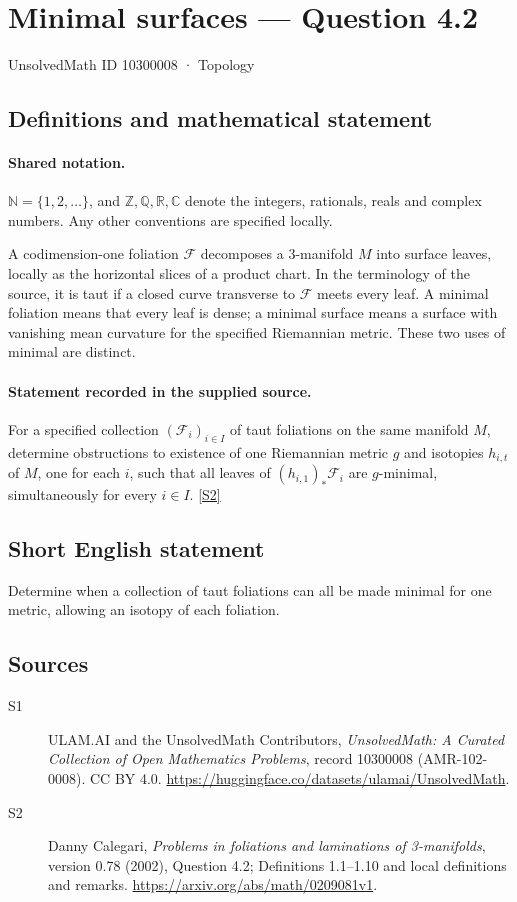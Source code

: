 \documentclass[11pt]{article}
\newcommand{\sref}[2]{\hyperlink{source:#1:#2}{[S#2]}}
\begin{document}
\setcounter{section}{10300007}
\section{Minimal surfaces — Question 4.2}\label{10300008}
{\small\sffamily UnsolvedMath ID 10300008 · Topology}
\subsection{Definitions and mathematical statement}

\paragraph{Shared notation.}$\mathbb N=\{1,2,\ldots\}$, and $\mathbb Z,\mathbb Q,\mathbb R,\mathbb C$ denote the integers, rationals, reals and complex numbers. Any other conventions are specified locally.


A codimension-one foliation $\mathcal F$ decomposes a $3$-manifold $M$ into surface leaves, locally as the horizontal slices of a product chart. In the terminology of the source, it is taut if a closed curve transverse to $\mathcal F$ meets every leaf. A minimal foliation means that every leaf is dense; a minimal surface means a surface with vanishing mean curvature for the specified Riemannian metric. These two uses of minimal are distinct.
\paragraph{Statement recorded in the supplied source.}
For a specified collection $(\mathcal F_i)_{i\in I}$ of taut foliations on the same manifold $M$, determine obstructions to existence of one Riemannian metric $g$ and isotopies $h_{i,t}$ of $M$, one for each $i$, such that all leaves of $(h_{i,1})_*\mathcal F_i$ are $g$-minimal, simultaneously for every $i\in I$. \sref{10300008}{2}
\subsection{Short English statement}
Determine when a collection of taut foliations can all be made minimal for one metric, allowing an isotopy of each foliation.
\subsection{Sources}
\begin{description}
\item[\hypertarget{source:10300008:1}{S1}] ULAM.AI and the UnsolvedMath Contributors, \emph{UnsolvedMath: A Curated Collection of Open Mathematics Problems}, record 10300008 (AMR-102-0008). CC BY 4.0. \url{https://huggingface.co/datasets/ulamai/UnsolvedMath}.
\item[\hypertarget{source:10300008:2}{S2}] Danny Calegari, \emph{Problems in foliations and laminations of 3-manifolds}, version 0.78 (2002), Question 4.2; Definitions 1.1--1.10 and local definitions and remarks. \url{https://arxiv.org/abs/math/0209081v1}.
\end{description}
\label{end:10300008}
\end{document}
